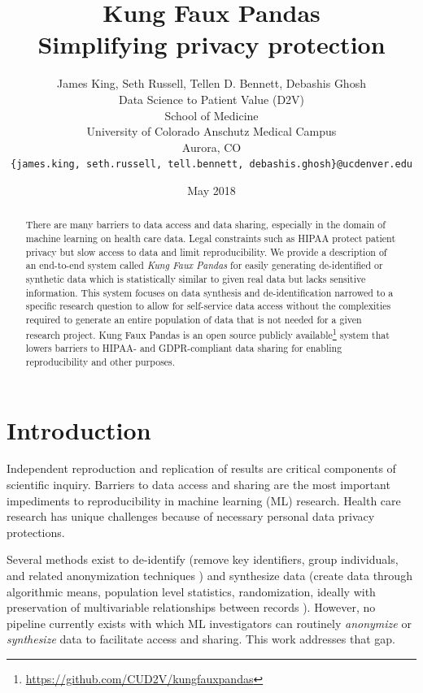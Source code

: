 \documentclass{article}
\title{%
  Kung Faux Pandas \\
  \large Simplifying privacy protection
  }
\author{
  James King, Seth Russell, Tellen D. Bennett, Debashis Ghosh\\
  Data Science to Patient Value (D2V)\\
  School of Medicine\\
  University of Colorado Anschutz Medical Campus\\
  Aurora, CO\\
  \texttt{\{james.king, seth.russell, tell.bennett, debashis.ghosh\}@ucdenver.edu}
  }
\date{May 2018}
\begin{document}

\maketitle

\begin{abstract}
There are many barriers to data access and data sharing, especially in the domain of machine learning on health care data. Legal constraints such as HIPAA protect patient privacy but slow access to data and limit reproducibility. We provide a description of an end-to-end system called \emph{Kung Faux Pandas} for easily generating de-identified or synthetic data which is statistically similar to given real data but lacks sensitive information. This system focuses on data synthesis and de-identification narrowed to a specific research question to allow for self-service data access without the complexities required to generate an entire population of data that is not needed for a given research project. Kung Faux Pandas is an open source publicly available\footnote{\url{https://github.com/CUD2V/kungfauxpandas}} system that lowers barriers to HIPAA- and GDPR-compliant data sharing for enabling reproducibility and other purposes.
\end{abstract}

\section{Introduction}

Independent reproduction and replication of results are critical components of scientific inquiry. Barriers to data access and sharing are the most important impediments to reproducibility in machine learning (ML) research. Health care research has unique challenges because of necessary personal data privacy protections.

Several methods exist to de-identify (remove key identifiers, group individuals, and related anonymization techniques \cite{hippapro}) and synthesize data (create data through algorithmic means, population level statistics, randomization, ideally with preservation of multivariable relationships between records \cite{walonoski_synthea_2018, patki_synthetic_2016, choi_generating_2017}). However, no pipeline currently exists with which ML investigators can routinely \emph{anonymize} or \emph{synthesize} data to facilitate access and sharing. This work addresses that gap.
\end{document}

